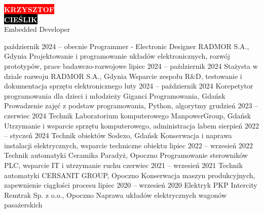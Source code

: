 \documentclass[9pt]{developercv}
\begin{document}

\begin{minipage}[t]{0.40\textwidth}
	\vspace{-\baselineskip}
	\colorbox{red}{{\HUGE\textcolor{white}{\textbf{KRZYSZTOF}}}}\\
	\colorbox{black}{{\HUGE\textcolor{white}{\textbf{CIEŚLIK}}}}\\
	\vspace{6pt}
	{\huge Embedded Developer}\\
\end{minipage}\hfill


\vspace{0.5cm}



\begin{entrylist}
	\entry
		{październik 2024 -- obecnie}
		{Programmer - Electronic Designer}
		{RADMOR S.A., Gdynia}
		{Projektowanie i programowanie układów elektronicznych, rozwój prototypów, prace badawczo-rozwojowe}
	\entry
		{lipiec 2024 -- październik 2024}
		{Stażysta w dziale rozwoju}
		{RADMOR S.A., Gdynia}
		{Wsparcie zespołu R\&D, testowanie i dokumentacja sprzętu elektronicznego}
	\entry
		{luty 2024 -- październik 2024}
		{Korepetytor programowania dla dzieci i młodzieży}
		{Giganci Programowania, Gdańsk}
		{Prowadzenie zajęć z podstaw programowania, Python, algorytmy}
	\entry
		{grudzień 2023 -- czerwiec 2024}
		{Technik Laboratorium komputerowego}
		{ManpowerGroup, Gdańsk}
		{Utrzymanie i wsparcie sprzętu komputerowego, administracja labem}
	\entry
		{sierpień 2022 -- styczeń 2024}
		{Technik obiektów}
		{Sodexo, Gdańsk}
		{Konserwacja i naprawa instalacji elektrycznych, wsparcie techniczne obiektu}
	\entry
		{lipiec 2022 -- wrzesień 2022}
		{Technik automatyki}
		{Ceramika Paradyż, Opoczno}
		{Programowanie sterowników PLC, wsparcie IT i utrzymanie ruchu}
	\entry
		{czerwiec 2021 -- wrzesień 2021}
		{Technik automatyki}
		{CERSANIT GROUP, Opoczno}
		{Konserwacja maszyn produkcyjnych, zapewnienie ciągłości procesu}
	\entry
		{lipiec 2020 -- wrzesień 2020}
		{Elektryk}
		{PKP Intercity Remtrak Sp. z o.o., Opoczno}
		{Naprawa układów elektrycznych wagonów pasażerskich}
\end{entrylist}
\end{document}
